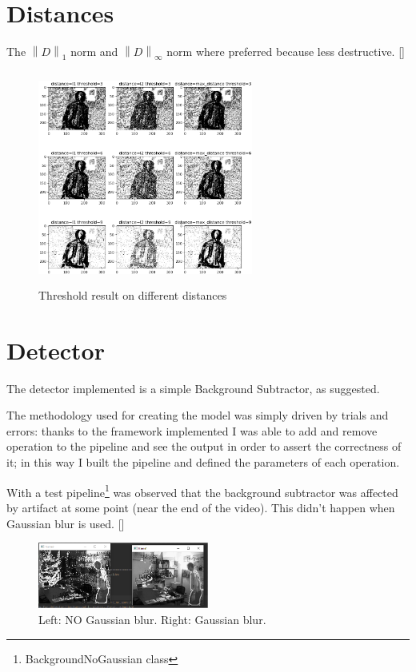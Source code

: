 \documentclass{article}
\newcommand{\CREF}[1]{[\hyperref[#1]{\Cref{#1}}]}
\newcommand{\norm}[1]{\left\lVert#1\right\rVert}
\begin{document}
\section{Distances}
The $\norm{D}_{1}$ norm and $\norm{D}_{\infty}$ norm where preferred because less destructive. \CREF{fig:thr}
\begin{figure}
    \centering
    \includegraphics[width=200pt,height=200pt]{thr_distances.png}
    \caption{Threshold result on different distances}
    \label{fig:thr}
\end{figure}

\section{Detector}
The detector implemented is a simple Background Subtractor, as suggested.

The methodology used for creating the model was simply driven by trials and errors: thanks to the framework implemented I was able to add and remove operation to the pipeline and see the output in order to assert the correctness of it; in this way I built the pipeline and defined the parameters of each operation.

With a test pipeline\footnote{BackgroundNoGaussian class} was observed that the background subtractor was affected by artifact at some point (near the end of the video).
This didn't happen when Gaussian blur is used. \CREF{fig:gaussian}
\begin{figure}[ht]
    \centering
    \includegraphics[width=0.5\textwidth,keepaspectratio]{background_no_gaussian.PNG}
    \caption{Left: NO Gaussian blur. Right: Gaussian blur.}
    \label{fig:gaussian}
\end{figure}
\end{document}
